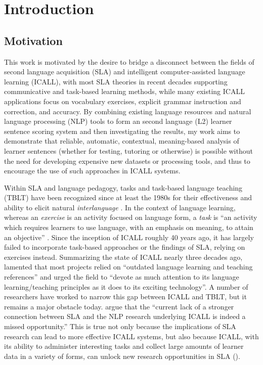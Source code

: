 \chapter{Introduction}
\label{chap:intro}

\section{Motivation}
\label{sec:motivation}


This work is motivated by the desire to bridge a disconnect between the fields of second language acquisition (SLA) and intelligent computer-assisted language learning (ICALL), with most SLA theories in recent decades supporting communicative and task-based learning methods, while many existing ICALL applications focus on vocabulary exercises, explicit grammar instruction and correction, and accuracy. By combining existing language resources and natural language processing (NLP) tools to form an second language (L2) learner sentence scoring system and then investigating the results, my work aims to demonstrate that reliable, automatic, contextual, meaning-based analysis of learner sentences (whether for testing, tutoring or otherwise) is possible without the need for developing expensive new datasets or processing tools, and thus to encourage the use of such approaches in ICALL systems. 

Within SLA and language pedagogy, tasks and task-based language teaching (TBLT) have been recognized since at least the 1980s for their effectiveness and ability to elicit natural \textit{interlanguage} \cite{ellis2003task}. In the context of language learning, whereas an \textit{exercise} is an activity focused on language form, a \textit{task} is ``an activity which requires learners to use language, with an emphasis on meaning, to attain an objective'' \cite{bygate2001researching}. Since the inception of ICALL roughly 40 years ago, it has largely failed to incorporate task-based approaches or the findings of SLA, relying on exercises instead. Summarizing the state of ICALL nearly three decades ago, \citet{oxford1993intelligent} lamented that most projects relied on ``outdated language learning and teaching references'' and urged the field to ``devote as much attention to its language learning/teaching principles as it does to its exciting technology''. A number of researchers have worked to narrow this gap between ICALL and TBLT, but it remains a major obstacle today. \citet{ziegler2017interdisciplinary} argue that the ``current lack of a stronger connection between SLA and the NLP research underlying ICALL is indeed a missed opportunity.'' This is true not only because the implications of SLA research can lead to more effective ICALL systems, but also because ICALL, with its ability to administer interesting tasks and collect large amounts of learner data in a variety of forms, can unlock new research opportunities in SLA (\citealp[cf.][]{MeurersDickinson2017}).

